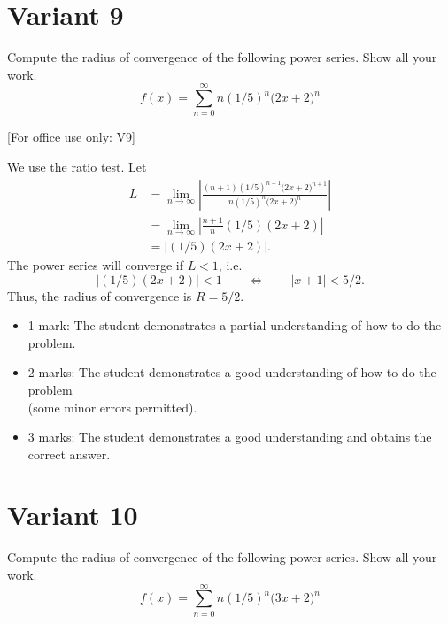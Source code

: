 \documentclass{article}
\begin{document}
        \newpage
        \section{Variant 9}
        \label{v9}


Compute the radius of convergence of the following power series. Show all your work.
    \[
    f(x) = \sum_{n=0}^\infty n\left(1/5\right)^n \big(2x + 2\big)^n
    \]


[For office use only: V9]
        \medskip



    We use the ratio test. Let
      \begin{align*}
        L &= \lim_{n\to\infty} \left| 
        \frac{(n+1)\left(1/5\right)^{n+1}\big(2x + 2\big)^{n+1}}
        {n\left(1/5\right)^n \big(2x + 2\big)^n}
        \right|\\
        &= \lim_{n\to\infty} \left| \frac{n+1}{n}(1/5)(2x+2)\right| \\
        &= \left| (1/5)(2x+2)\right|.
       \end{align*}
       The power series will converge if $L < 1$, i.e.
       \[
        \left| (1/5)(2x+2)\right| < 1 \qquad\Longleftrightarrow \qquad
        \left|x + 1\right| < 5/2.
       \]
       Thus, the radius of convergence is $R = 5/2$.
        \medskip

            \begin{small}
            \begin{itemize}
            \item 1 mark: The student demonstrates a partial understanding of how to do the problem.
            \item 2 marks: The student demonstrates a good understanding of how to do the problem \\ (some minor errors permitted).
            \item 3 marks: The student demonstrates a good understanding and obtains the correct answer.
            \end{itemize}
            \end{small}


        \newpage
        \section{Variant 10}
        \label{v10}


Compute the radius of convergence of the following power series. Show all your work.
    \[
    f(x) = \sum_{n=0}^\infty n\left(1/5\right)^n \big(3x + 2\big)^n
    \]
\end{document}
